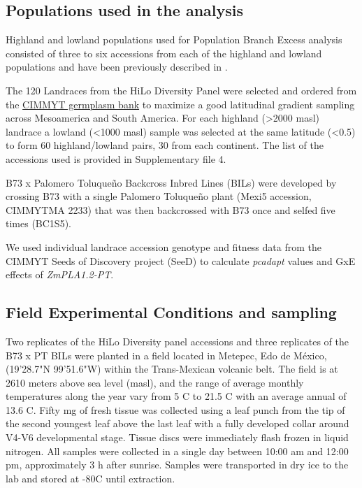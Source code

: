 \documentclass[9pt,twocolumn,twoside,lineno]{BioRxiv}
\begin{document}
\subsection{Populations used in the analysis } 
Highland and lowland populations used for Population Branch Excess analysis consisted of three to six accessions from each of the highland and lowland populations and have been previously described in \cite{Wang2020-mp, Wang2017-bc}. 

The 120 Landraces from the HiLo Diversity Panel were selected and ordered from the \href{http://mgb.cimmyt.org/gringlobal/search.aspx}{CIMMYT germplasm bank} to maximize a good latitudinal gradient sampling across Mesoamerica and South America. For each highland  (>2000 masl) landrace a lowland (<1000 masl) sample was selected at the same latitude (<0.5\degree) to form 60 highland/lowland pairs, 30 from each continent. 
The list of the accessions used is provided in Supplementary file 4.   

B73 x Palomero Toluqueño Backcross Inbred Lines (BILs) were developed by crossing B73 with a single Palomero Toluqueño plant (Mexi5 accession, CIMMYTMA 2233) that was then backcrossed with B73 once and selfed five times (BC1S5).  

We used  individual landrace accession genotype and fitness data from the CIMMYT Seeds of Discovery project (SeeD) \cite{Gates2019-xu} to calculate \textit{pcadapt} \cite{Luu2017-ws} values and GxE effects of \textit{ZmPLA1.2-PT}.

\subsection{Field Experimental Conditions and sampling} 
Two replicates of the HiLo Diversity panel accessions and three replicates of the B73 x PT BILs were planted in a field located in Metepec, Edo de México, (19'28.7"N 99'51.6"W) within the Trans-Mexican volcanic belt. 
The field is at 2610 meters above sea level (masl), and the range of average monthly temperatures along the year vary from 5 \degree C to 21.5 \degree C with an average annual of 13.6 \degree C.  
Fifty mg of fresh tissue was collected using a leaf punch from the tip of the second youngest leaf above the last leaf with a fully developed collar around V4-V6 developmental stage. 
Tissue discs were immediately flash frozen in liquid nitrogen. 
All samples were collected in a single day between 10:00 am and 12:00 pm, approximately 3 h after sunrise. 
Samples were transported in dry ice to the lab and stored at -80\degree C until extraction. 
\end{document}
